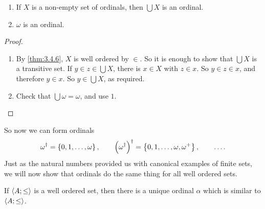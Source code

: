 \begin{corollary}
\label{cor:3.4.7}
\hfill
\begin{enumerate}
\item If $ X $ is a non-empty set of ordinals, then $ \bigcup X $ is an ordinal.
\item $ \omega $ is an ordinal.
\end{enumerate}
\end{corollary}

\begin{proof}
\hfill
\begin{enumerate}
\item By \ref{thm:3.4.6}, $ X $ is well ordered by $ \in $. So it is enough to show that $ \bigcup X $ is a transitive set. If $ y \in z \in \bigcup X $, there is $ x \in X $ with $ z \in x $. So $ y \in z \in x $, and therefore $ y \in x $. So $ y \in \bigcup X $, as required.
\item Check that $ \bigcup \omega = \omega $, and use $ 1 $.
\end{enumerate}
\end{proof}

\pagebreak

So now we can form ordinals
$$ \omega^\dagger = \cbr{0, 1, \dots, \omega}, \qquad \br{\omega^\dagger}^\dagger = \cbr{0, 1, \dots, \omega, \omega^+}, \qquad \dots. $$
Just as the natural numbers provided us with canonical examples of finite sets, we will now show that ordinals do the same thing for all well ordered sets.

\begin{theorem}
\label{thm:3.4.8}
If $ \left\langle A; \le \right\rangle $ is a well ordered set, then there is a unique ordinal $ \alpha $ which is similar to $ \left\langle A; \le \right\rangle $.
\end{theorem}

